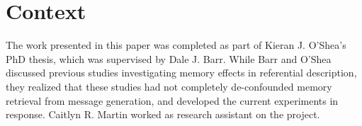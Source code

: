 \documentclass[natbib,man,a4paper]{apa6}
\begin{document}
\section*{Context}
\label{sec:org81a23cc}

The work presented in this paper was completed as part of Kieran J. O'Shea's PhD thesis, which was supervised by Dale J. Barr. While Barr and O'Shea discussed previous studies investigating memory effects in referential description, they realized that these studies had not completely de-confounded memory retrieval from message generation, and developed the current experiments in response. Caitlyn R. Martin worked as research assistant on the project.


\end{document}
